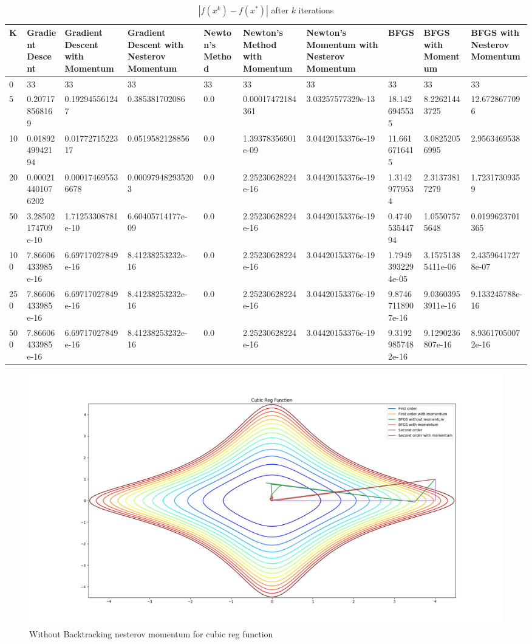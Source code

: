 \documentclass{article}
\begin{document}
\begin{table}[H]
	\centering
	\caption{$ | f(x^k) - f(x^*) | $ after $k$ iterations}
	\label{Cubic Reg function table}
	\begin{tabular}{|l|l|l|l|l|l|l|l|l|l|}
		\hline
		K & Gradient Descent & Gradient Descent with Momentum & Gradient Descent with Nesterov Momentum & Newton's Method & Newton's Method with Momentum & Newton's Momentum with Nesterov Momentum & BFGS & BFGS with Momentum & BFGS with Nesterov Momentum \\
		\hline
		0 & 33 & 33 & 33 & 33 & 33 & 33 & 33 & 33 & 33 \\
		\hline
		5 & 0.207178568169 & 0.192945561247 & 0.385381702086 & 0.0 & 0.00017472184361 & 3.03257577329e-13 & 18.1426945535 & 8.22621443725 & 12.6728677096 \\
		\hline
		10 & 0.0189249942194 & 0.0177271522317 & 0.0519582128856 & 0.0 & 1.39378356901e-09 & 3.04420153376e-19 & 11.6616716415 & 3.08252056995 & 2.9563469538 \\
		\hline
		20 & 0.000214401076202 & 0.000174695536678 & 0.000979482935203 & 0.0 & 2.25230628224e-16 & 3.04420153376e-19 & 1.31429779534 & 2.31373817279 & 1.72317309359 \\
		\hline
		50 & 3.28502174709e-10 & 1.71253308781e-10 & 6.60405714177e-09 & 0.0 & 2.25230628224e-16 & 3.04420153376e-19 & 0.474053544794 & 1.05507575648 & 0.0199623701365 \\
		\hline
		100 & 7.86606433985e-16 & 6.69717027849e-16 & 8.41238253232e-16 & 0.0 & 2.25230628224e-16 & 3.04420153376e-19 & 1.79493932294e-05 & 3.15751385411e-06 & 2.43596417278e-07 \\
		\hline
		250 & 7.86606433985e-16 & 6.69717027849e-16 & 8.41238253232e-16 & 0.0 & 2.25230628224e-16 & 3.04420153376e-19 & 9.87467118907e-16 & 9.03603953911e-16 & 9.133245788e-16 \\
		\hline
		500 & 7.86606433985e-16 & 6.69717027849e-16 & 8.41238253232e-16 & 0.0 & 2.25230628224e-16 & 3.04420153376e-19 & 9.31929857482e-16 & 9.1290236807e-16 & 8.93617050072e-16 \\
		\hline
	\end{tabular}
\end{table}

\begin{figure}[H]
	\includegraphics[width=\linewidth]{../Images/cubicregbacktrack.png}
	\caption{Without Backtracking nesterov momentum for cubic reg function}
	\label{fig:With Backtracking nesterov momentum for cubic reg function}
\end{figure}
\end{document}
